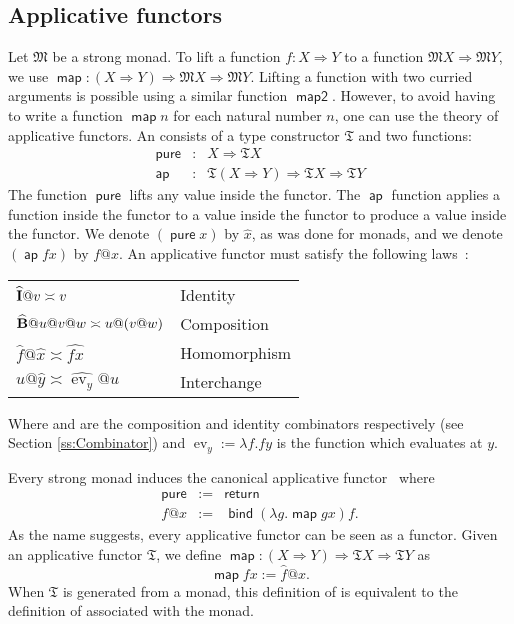 \documentclass{elsarticle}
\makeatletter
\newcommand{\assign}{:=}
\newcommand{\tmop}[1]{\ensuremath{\operatorname{#1}}}
\newcommand{\tmstrong}[1]{\textbf{#1}}
\newcommand{\tmtextsf}[1]{{\sffamily{#1}}}
\newcommand{\tmtextup}[1]{{\upshape{#1}}}
\newcommand{\defEq}{\ensuremath{\assign}}
\newcommand{\pure}[1]{\ensuremath{\widehat{#1}}}
\newcommand{\app}{@}
\newcommand{\comp}{\text{{\tmstrong{\tmtextup{B}}}}}
\newcommand{\id}{\text{{\tmstrong{\tmtextup{I}}}}}
\makeatother
\begin{document}
\subsection{Applicative functors}\label{ss:applicative}Let $\mathfrak{M}$ be a
strong monad. To lift a function $f : X \Rightarrow Y$ to a function
$\mathfrak{M}X \Rightarrow \mathfrak{M}Y$, we use $\tmop{\mathsf{map}} : (X
\Rightarrow Y) \Rightarrow \mathfrak{M}X \Rightarrow \mathfrak{M}Y$. Lifting a
function with two curried arguments is possible using a similar function
$\tmop{\mathsf{map2}}$. However, to avoid having to write a function
$\tmop{\mathsf{map}} \mathit{n}$ for each natural number $n$, one can use the
theory of applicative functors. An consists of a type constructor
$\mathfrak{T}$ and two functions:
\begin{eqnarray*}
  \tmop{\mathsf{pure}} & : & X \Rightarrow \mathfrak{T}X\\
  \tmop{\mathsf{ap}} & : & \mathfrak{T}(X \Rightarrow Y) \Rightarrow
  \mathfrak{T}X \Rightarrow \mathfrak{T}Y
\end{eqnarray*}
The function $\tmop{\mathsf{pure}}$ lifts any value inside the functor. The
$\tmop{\mathsf{ap}}$ function applies a function inside the functor to a value
inside the functor to produce a value inside the functor. We
denote $( \tmop{\mathsf{pure}} x)$ by $\pure{x}$, as was done for monads, and
we denote $( \tmop{\mathsf{ap}} f x)$ by $f \app x$. An applicative functor
must satisfy the following laws~{\cite{mcbride:2008}}:

\begin{center}
  \begin{tabular}{ll}
    $\pure{\id}  \app v \asymp v$ & Identity\\
    $\pure{\comp}  \app u \app v \app w \asymp u \app (v \app w)$ &
    Composition\\
    $\pure{f}  \app  \pure{x}  \asymp  \pure{f x}$ & Homomorphism\\
    $u \app  \pure{y}  \asymp  \pure{\tmop{ev}_y}  \app u$ & Interchange
  \end{tabular}
\end{center}

Where {\comp} and {\id} are the composition and identity combinators
respectively (see Section \ref{ss:Combinator}) and $\tmop{ev}_y \assign
\lambda f. f y$ is the function which evaluates at $y$.

Every strong monad induces the canonical applicative
functor~{\cite{mcbride:2008}} where
\begin{eqnarray*}
  \tmop{\mathsf{pure}} & \assign & \tmop{\mathsf{return}}\\
  f \app x & \assign & \tmop{\mathsf{bind}} (\lambda g. \tmop{\mathsf{map}} g
  x) f.
\end{eqnarray*}
As the name suggests, every applicative functor can be seen as a functor.
Given an applicative functor $\mathfrak{T}$, we define
$\tmop{\mathsf{map}} : (X \Rightarrow Y) \Rightarrow \mathfrak{T}X \Rightarrow \mathfrak{T}Y$ as
\[ \tmop{\mathsf{map}} f x \defEq \hat{f}  \app x. \]
When $\mathfrak{T}$ is generated from a monad, this definition of
\tmtextsf{map} is equivalent to the definition of \tmtextsf{map} associated
with the monad.
\end{document}
